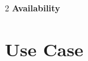 \documentclass{article}
\begin{document}
\begin{multicols}{2}
\textbf{Availability} 



\section{Use Case}


\end{multicols}
\end{document}
